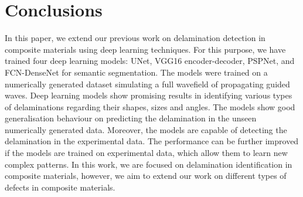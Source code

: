 \section{Conclusions}
\label{conclusion}
In this paper, we extend our previous work on delamination detection in composite materials using deep learning techniques. 
For this purpose, we have trained four deep learning models: UNet, VGG16 encoder-decoder, PSPNet, and  FCN-DenseNet for semantic segmentation.
The models were trained on a numerically generated dataset simulating a  full wavefield of propagating guided waves.
Deep learning models show promising results in identifying various types of delaminations regarding their shapes, sizes and angles. 
The models show good generalisation behaviour on predicting the delamination in the unseen numerically generated data.
Moreover, the models are capable of detecting the delamination in the experimental data.
The performance can be further improved if the models are trained on experimental data, which allow them to learn new complex patterns.
In this work, we are focused on delamination identification in composite materials, however, we aim to extend our work on different types of defects in composite materials.
